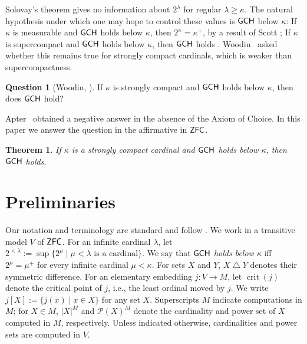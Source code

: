 \documentclass[10pt,a4paper]{amsart}
\newtheorem{mainthm}{Theorem}
\theoremstyle{definition}
\newtheorem{q}{Question}
\theoremstyle{remark}
\newcommand\symdiff{\mathbin{\bigtriangleup}}
\renewcommand{\mid}{\mathrel{|}\allowbreak}
\DeclareMathOperator{\crit}{crit}
\newcommand*\axiomfont[1]{\textsf{\textup{#1}}}
\newcommand\zfc{\axiomfont{ZFC}}
\newcommand\gch{\axiomfont{GCH}}
\begin{document}
Solovay's theorem gives no information about $2^\lambda$ for regular $\lambda \geq \kappa$.
The natural hypothesis under which one may hope to control these values is $\gch$ below $\kappa$:
If $\kappa$ is measurable and $\gch$ holds below $\kappa$, then $2^\kappa=\kappa^+$,
by a result of Scott \cite[Corollary~5.8]{Kanamori};
If $\kappa$ is supercompact and $\gch$ holds below $\kappa$,
then $\gch$ holds \cite[Proposition~22.2]{Kanamori}.
Woodin~\cite{Apter2000} asked whether this remains true for strongly compact cardinals, which
is weaker than supercompactness.
\begin{q}[Woodin, {\cite{Apter2000}}]\label{qwoodin}
    If $\kappa$ is strongly compact and $\gch$ holds below $\kappa$, then does $\gch$ hold?
\end{q}

Apter~\cite{Apter2000} obtained a negative answer in the absence of the Axiom of Choice.
In this paper we answer the question in the affirmative in $\zfc$.


\begin{mainthm}\label{thma}
    If $\kappa$ is a strongly compact cardinal and $\gch$ holds below $\kappa$,
    then $\gch$ holds.
\end{mainthm}



\section{Preliminaries}\label{sec:prelim}

Our notation and terminology are standard and follow \cite{Kanamori}.
We work in a transitive model $V$ of $\zfc$.
For an infinite cardinal $\lambda$, let
$2^{<\lambda}:=\sup\{2^\mu\mid \mu<\lambda\text{ is a cardinal}\}$.
We say that \emph{$\gch$ holds below $\kappa$} iff $2^\mu=\mu^+$ for every infinite cardinal $\mu<\kappa$.
For sets $X$ and $Y$, $X\symdiff Y$ denotes their symmetric difference.
For an elementary embedding $j:V\rightarrow M$,
let $\crit(j)$ denote the critical point of $j$, i.e., the least ordinal moved by $j$.
We write $j[X]:=\{j(x)\mid x\in X\}$ for any set $X$.
Superscripts $M$ indicate computations in $M$; for $X\in M$, $|X|^M$ and $\mathcal P(X)^M$ denote the cardinality and power set of $X$ computed in $M$, respectively.
Unless indicated otherwise, cardinalities and power sets are computed in $V$.
\end{document}
